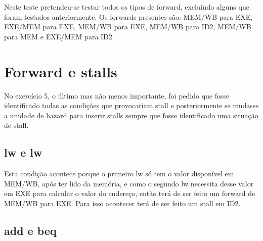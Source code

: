 \documentclass[pdftex,12pt,a4paper]{report}
\begin{document}
Neste teste pretendeu-se testar todos os tipos de forward, excluindo alguns que foram testados anteriormente. Os forwards presentes são: MEM/WB para EXE, EXE/MEM para EXE, MEM/WB para EXE, MEM/WB para ID2, MEM/WB para MEM e EXE/MEM para ID2.

\section{Forward e stalls}

No exercício 5, o último mas não menos importante, foi pedido que fosse identificado todas as condições que provocariam stall e posteriormente se mudasse a unidade de hazard para inserir stalls sempre que fosse identificado uma situação de stall.

\subsection{lw e lw}
\begin{table}[!htb]
\centering
\label{my-label}
\end{table}

Esta condição acontece porque o primeiro lw só tem o valor disponível em MEM/WB, após ter lido da memória, e como o segundo lw necessita desse valor em EXE para calcular o valor do endereço, então terá de ser feito um forward de MEM/WB para EXE. Para isso acontecer terá de ser feito um stall em ID2.

\subsection{add e beq}
\begin{table}[!htb]
\centering
\label{my-label}
\end{table}
\end{document}
